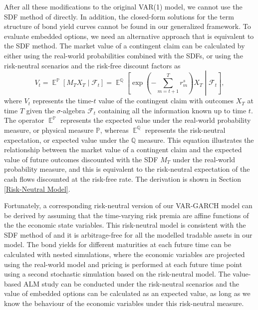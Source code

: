 \documentclass{sfuthesis}
\DeclareMathOperator{\E}{\mathbb{E}}
\numberwithin{equation}{chapter}
\begin{document}
	
		\justify
		After all these modifications to the original VAR(1) model, we cannot use the SDF method of \citet{Hoevenaars2008} directly. In addition, the closed-form solutions for the term structure of bond yield curves cannot be found in our generalized framework. To evaluate embedded options, we need an alternative approach that is equivalent to the SDF method. The market value of a contingent claim can be calculated by either using the real-world probabilities combined with the SDFs, or using the risk-neutral scenarios and the risk-free discount factors as
		\begin{equation}
		\label{eq:ESG_1}
		V_{t} = \E^{\mathbb{P}}\left[M_TX_T\middle|\mathcal{F}_t\right] = \E^{\mathbb{Q}}\left[\exp\left({-\sum_{m=t+1}^{T}r_m^{s}}\right)X_T\middle|\mathcal{F}_t\right],
		\end{equation}
		where $V_t$ represents the time-$t$ value of the contingent claim with outcomes $X_T$ at time $T$ given the $\sigma$-algebra $\mathcal{F}_t$ containing all the information known up to time $t$. The operator $\E^{\mathbb{P}}$ represents the expected value under the real-world probability measure, or physical measure $\mathbb{P}$, whereas $\E^{\mathbb{Q}}$ represents the risk-neutral expectation, or expected value under the $\mathbb{Q}$ measure. This equation illustrates the relationship between the market value of a contingent claim and the expected value of future outcomes discounted with the SDF $M_T$  under the real-world probability measure, and this is equivalent to the risk-neutral expectation of the cash flows discounted at the risk-free rate. The derivation is shown in Section \ref{Risk-Neutral Model}.
	
	
		\justify
		Fortunately, a corresponding risk-neutral version of our VAR-GARCH model can be derived by assuming that the time-varying risk premia are affine functions of the the economic state variables. This risk-neutral model is consistent with the SDF method of \citet{Hoevenaars2008} and it is arbitrage-free for all the modelled tradable assets in our model. The bond yields for different maturities at each future time can be calculated with nested simulations, where the economic variables are projected using the real-world model and pricing is performed at each future time point using a second stochastic simulation based on the risk-neutral model. The value-based ALM study can be conducted under the risk-neutral scenarios and the value of embedded options can be calculated as an expected value, as long as we know the behaviour of the economic variables under this risk-neutral measure.
	
\end{document}
